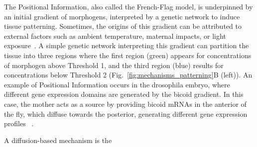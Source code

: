 
The Positional Information, also called the French-Flag model, is underpinned by an initial gradient of morphogens, interpreted by a genetic network to induce tissue patterning.
Sometimes, the origins of this gradient can be attributed to external factors such as ambient temperature, maternal impacts, or light exposure~\parencite{Schier2009}.
A simple genetic network interpreting this gradient can partition the tissue into three regions where the first region (green) appears for concentrations of morphogen above Threshold 1, and the third region (blue) results for concentrations below Threshold 2 (Fig.~\ref{fig:mechanisms_patterning}B (left)).
An example of Positional Information occurs in the drosophila embryo, where different gene expression domains are generated by the bicoid gradient.
In this case, the mother acts as a source by providing bicoid mRNAs in the anterior of the fly, which diffuse towards the posterior, generating different gene expression profiles ~\parencite{grimm2010modelling}.

A diffusion-based mechanism is the





